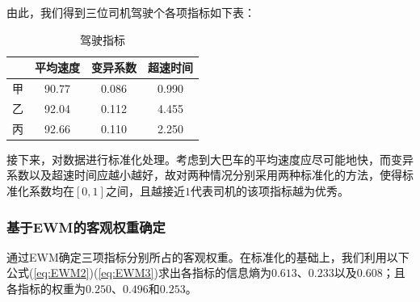 \documentclass[bwprint]{cumcmthesis}
\begin{document}
        由此，我们得到三位司机驾驶个各项指标如下表：
        
        \begin{table}[htbp]
            \centering
            \caption{驾驶指标}
                \begin{tabular}{|c|c|c|c|}
                \hline
                & 平均速度 & 变异系数 & 超速时间 \\
                \hline
                甲     & 90.77 & 0.086 & 0.990 \\
                \hline
                乙     & 92.04 & 0.112 & 4.455 \\
                \hline
                丙     & 92.66 & 0.110 & 2.250 \\
                \hline
                \end{tabular}
            \label{tab:seven}
          \end{table}

        接下来，对数据进行标准化处理。考虑到大巴车的平均速度应尽可能地快，而变异系数以及超速时间应越小越好，故对两种情况分别采用两种标准化的方法，使得标准化系数均在$[0,1]$之间，且越接近$1$代表司机的该项指标越为优秀。

            \subsubsection{基于EWM的客观权重确定}
            通过EWM确定三项指标分别所占的客观权重。在标准化的基础上，我们利用以下公式(\ref{eq:EWM2})(\ref{eq:EWM3})求出各指标的信息熵为$0.613$、$0.233$以及$0.608$；且各指标的权重为$0.250$、$0.496$和$0.253$。
\end{document}
